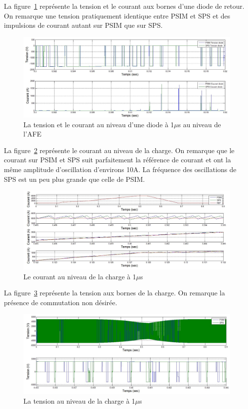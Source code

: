 \documentclass[11pt,letterpaper,final]{report}
\begin{document}
La figure~\ref{AF_DC_DI1} représente la tension et le courant aux bornes d'une diode de retour. On remarque une tension pratiquement identique entre PSIM et SPS et des impulsions de courant autant sur PSIM que sur SPS.

\begin{figure}[htb]
\centering
\includegraphics[scale=0.5]{Fig/DCP_AFE/1u/ten_diode_afe.jpg}
\caption{La tension et le courant au niveau d'une diode à 1$\mu$s au niveau de l'AFE}
\label{AF_DC_DI1}
\end{figure}

La figure~\ref{AF_DC_CHA1} représente le courant au niveau de la charge. On remarque que le courant sur PSIM et SPS suit parfaitement la référence de courant et ont la même amplitude d'oscillation d'environs 10A. La fréquence des oscillations de SPS est un peu plus grande que celle de PSIM.

\begin{figure}[htb]
\centering
\includegraphics[scale=0.5]{Fig/DCP_AFE/1u/cour_ch.jpg}
\caption{Le courant au niveau de la charge à 1$\mu$s}
\label{AF_DC_CHA1}
\end{figure}

La figure~\ref{AF_DC_CHV1} représente la tension aux bornes de la charge. On remarque la présence de commutation non désirée.

\begin{figure}[htb]
\centering
\includegraphics[scale=0.5]{Fig/DCP_AFE/1u/ten_ch.jpg}
\caption{La tension au niveau de la charge à 1$\mu$s}
\label{AF_DC_CHV1}
\end{figure}
\end{document}
